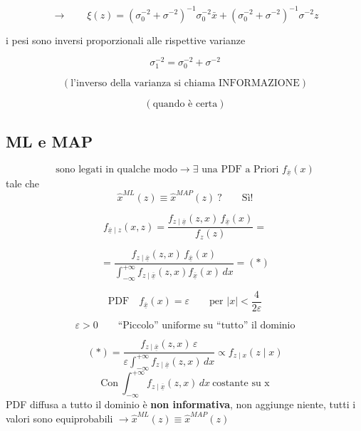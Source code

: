 \documentclass[11pt,a4paper]{article}
\begin{document}
\[
\to
\qquad
\xi(z)
=
(\sigma_0^{-2}+\sigma^{-2})^{-1}\sigma_0^{-2}\bar x
+
(\sigma_0^{-2}+\sigma^{-2})^{-1}\sigma^{-2}z
\]

i pesi sono inversi proporzionali alle rispettive varianze

\[
\sigma_1^{-2}=\sigma_0^{-2}+\sigma^{-2}
\]

\[
(\text{l'inverso della varianza si chiama INFORMAZIONE})
\]

\[
(\text{quando è certa})
\]

\newpage

\subsection*{ML e MAP}


\[
\text{sono legati in qualche modo}\to \exists \text{ una PDF a Priori } f_{ \overline{\underline{x}}}(x)
\]
tale che
\[
\hat x^{ML}(z)\equiv \hat x^{MAP}(z)\ ? \qquad \text{Sì!}
\]

\[
f_{ \overline{\underline{x}}\mid z}(x, z)
=
\frac{f_{z\mid  \overline{\underline{x}}}( z,x)\,f_{ \overline{\underline{x}}}(x)}{f_z( z)}
=
\]

\[
=
\frac{f_{z\mid  \overline{\underline{x}}}( z,x)\,f_{ \overline{\underline{x}}}(x)}
{\int_{-\infty}^{+\infty} f_{z\mid  \overline{\underline{x}}}( z,x)f_{ \overline{\underline{x}}}(x)\,dx}
=
(*)
\]


\[
\text{PDF} \quad f_{\overline{\underline{x}}}(x)=\varepsilon
\qquad
\text{per } |x|<\frac{4}{2\varepsilon}
\]

\begin{center}
\end{center}

\[
\varepsilon>0
\qquad
\text{``Piccolo'' uniforme su ``tutto'' il dominio}
\]

\[
(*)
=
\frac{f_{z\mid \overline{\underline{x}}}(z,x)\,\varepsilon}
{\varepsilon\int_{-\infty}^{+\infty}f_{z\mid \overline{\underline{x}}}( z,x)\,dx}
\propto
f_{z\mid x}(z\mid x)
\]
\[
\text{Con} \ \int_{-\infty}^{+\infty}f_{z\mid \overline{\underline{x}}}( z,x)\,dx \ \text{costante su x}
\]
PDF diffusa a tutto il dominio è \textbf{non informativa}, non aggiunge niente, tutti i valori sono equiprobabili $\rightarrow \hat x^{ML}(z)\equiv \hat x^{MAP}(z)$
\end{document}
